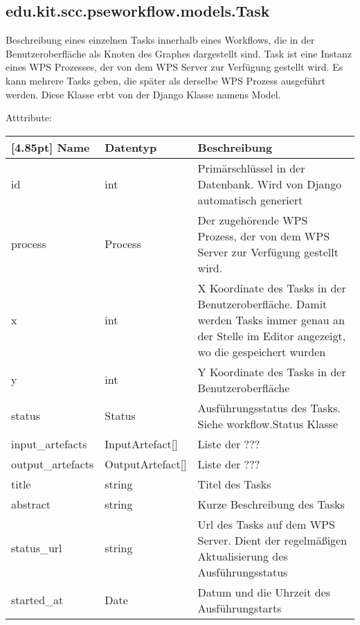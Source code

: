         \subsection{edu.kit.scc.pseworkflow.models.Task}	
    		Beschreibung eines einzelnen Tasks innerhalb eines Workflows, die in der Benutzeroberfläche als Knoten des Graphes dargestellt sind. Task ist eine Instanz eines WPS Prozesses, der von dem WPS Server zur Verfügung gestellt wird. Es kann mehrere Tasks geben, die später als derselbe WPS Prozess ausgeführt werden. \newline
    		Diese Klasse erbt von der Django Klasse namens \glqq Model\grqq .
    		
    		Atttribute:
			\begin{center}
				\setlength\tabcolsep{5pt}
				\renewcommand{\arraystretch}{1.5}
				
				\begin{tabularx}{\textwidth}{|l|l|X|}
					\hline
					\rowcolor[gray]{0.75}[4.85pt]
					Name & Datentyp & Beschreibung \\ \hline 
	           		id & int & Primärschlüssel in der Datenbank. Wird von Django automatisch generiert \\ \hline
	           		process & Process & Der zugehörende WPS Prozess, der von dem WPS Server zur Verfügung gestellt wird. \\\hline
	           		x & int & X Koordinate des Tasks in der Benutzeroberfläche. Damit werden Tasks immer genau an der Stelle im Editor angezeigt, wo die gespeichert wurden\\ \hline
	           		y & int & Y Koordinate des Tasks in der Benutzeroberfläche\\ \hline
	           		status & Status & Ausführungsstatus des Tasks. Siehe workflow.Status Klasse \\ \hline
	           		input\_artefacts & InputArtefact[] & Liste der ??? \\ \hline
	           		output\_artefacts & OutputArtefact[] & Liste der ??? \\ \hline
	           		title & string & Titel des Tasks \\ \hline
	           		abstract & string & Kurze Beschreibung des Tasks \\ \hline
	           		status\_url & string & Url des Tasks auf dem WPS Server. Dient der  regelmäßigen Aktualisierung des Ausführungsstatus \\ \hline
	           		started\_at & Date & Datum und die Uhrzeit des Ausführungstarts \\ \hline
				\end{tabularx}
			\end{center}
    			
